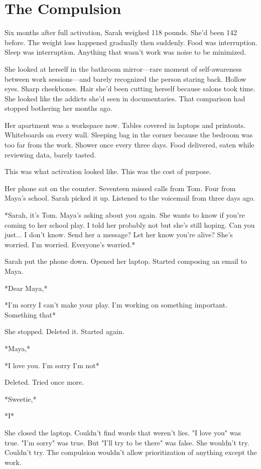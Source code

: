 \chapter{The Compulsion}
\label{ch:23}


Six months after full activation, Sarah weighed 118 pounds. She'd been 142 before. The weight loss happened gradually then suddenly. Food was interruption. Sleep was interruption. Anything that wasn't work was noise to be minimized.

She looked at herself in the bathroom mirror—rare moment of self-awareness between work sessions—and barely recognized the person staring back. Hollow eyes. Sharp cheekbones. Hair she'd been cutting herself because salons took time. She looked like the addicts she'd seen in documentaries. That comparison had stopped bothering her months ago.

Her apartment was a workspace now. Tables covered in laptops and printouts. Whiteboards on every wall. Sleeping bag in the corner because the bedroom was too far from the work. Shower once every three days. Food delivered, eaten while reviewing data, barely tasted.

This was what activation looked like. This was the cost of purpose.

Her phone sat on the counter. Seventeen missed calls from Tom. Four from Maya's school. Sarah picked it up. Listened to the voicemail from three days ago.

*Sarah, it's Tom. Maya's asking about you again. She wants to know if you're coming to her school play. I told her probably not but she's still hoping. Can you just... I don't know. Send her a message? Let her know you're alive? She's worried. I'm worried. Everyone's worried.*

Sarah put the phone down. Opened her laptop. Started composing an email to Maya.

*Dear Maya,*

*I'm sorry I can't make your play. I'm working on something important. Something that*

She stopped. Deleted it. Started again.

*Maya,*

*I love you. I'm sorry I'm not*

Deleted. Tried once more.

*Sweetie,*

*I*

She closed the laptop. Couldn't find words that weren't lies. "I love you" was true. "I'm sorry" was true. But "I'll try to be there" was false. She wouldn't try. Couldn't try. The compulsion wouldn't allow prioritization of anything except the work.

